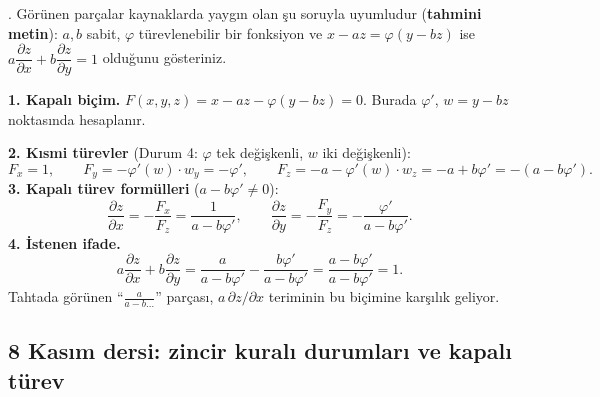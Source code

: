\begin{soru}
.
Görünen parçalar kaynaklarda yaygın olan şu soruyla uyumludur (\textbf{tahmini metin}):
$a,b$ sabit, $\varphi$ türevlenebilir bir fonksiyon ve $x-az=\varphi(y-bz)$ ise $a\dfrac{\partial z}{\partial x}+b\dfrac{\partial z}{\partial y}=1$
olduğunu gösteriniz.
\end{soru}
\begin{cevap}
\textbf{1. Kapalı biçim.} $F(x,y,z)=x-az-\varphi(y-bz)=0$. Burada $\varphi'$, $w=y-bz$ noktasında hesaplanır.

\textbf{2. Kısmi türevler} (Durum 4: $\varphi$ tek değişkenli, $w$ iki değişkenli):
\[
F_x=1,\qquad F_y=-\varphi'(w)\cdot w_y=-\varphi',\qquad F_z=-a-\varphi'(w)\cdot w_z=-a+b\varphi'=-(a-b\varphi').
\]
\textbf{3. Kapalı türev formülleri} ($a-b\varphi'\ne0$):
\[
\frac{\partial z}{\partial x}=-\frac{F_x}{F_z}=\frac{1}{a-b\varphi'},\qquad
\frac{\partial z}{\partial y}=-\frac{F_y}{F_z}=-\frac{\varphi'}{a-b\varphi'}.
\]
\textbf{4. İstenen ifade.}
\[
a\frac{\partial z}{\partial x}+b\frac{\partial z}{\partial y}=\frac{a}{a-b\varphi'}-\frac{b\varphi'}{a-b\varphi'}=\frac{a-b\varphi'}{a-b\varphi'}=1 .
\]
Tahtada görünen ``$\frac{a}{a-b\dots}$'' parçası, $a\,\partial z/\partial x$ teriminin bu biçimine karşılık geliyor.
\end{cevap}

\subsection{8 Kasım dersi: zincir kuralı durumları ve kapalı türev}

